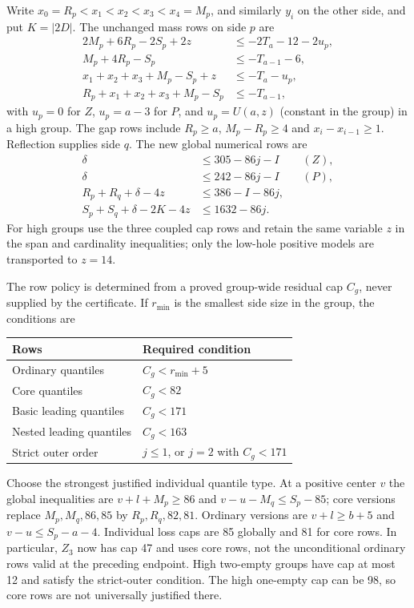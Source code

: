 \documentclass[11pt,a4paper]{article}
\begin{document}
Write $x_0=R_p<x_1<x_2<x_3<x_4=M_p$, and similarly $y_i$ on the other
side, and put $K=|2D|$. The unchanged mass rows on side $p$ are
\begin{align*}
 2M_p+6R_p-2S_p+2z&\le-2T_a-12-2u_p,\\
 M_p+4R_p-S_p&\le-T_{a-1}-6,\\
 x_1+x_2+x_3+M_p-S_p+z&\le-T_a-u_p,\\
 R_p+x_1+x_2+x_3+M_p-S_p&\le-T_{a-1},
\end{align*}
with $u_p=0$ for $Z$, $u_p=a-3$ for $P$, and $u_p=U(a,z)$ (constant in the group) in a
high group. The gap rows include $R_p\ge a$,
$M_p-R_p\ge4$ and $x_i-x_{i-1}\ge1$. Reflection supplies side $q$.
The new global numerical rows are
\begin{align*}
 \delta&\le305-86j-I &&(Z),\\
 \delta&\le242-86j-I &&(P),\\
 R_p+R_q+\delta-4z&\le386-I-86j,\\
 S_p+S_q+\delta-2K-4z&\le1632-86j.
\end{align*}
For high groups use the three coupled cap rows and retain the same variable
$z$ in the span and cardinality inequalities; only the low-hole positive models
are transported to $z=14$.

The row policy is determined from a proved group-wide residual cap
$C_g$, never supplied by the certificate. If $r_{\min}$ is the smallest
side size in the group, the conditions are
\begin{center}\small
\begin{tabular}{ll}\toprule
Rows&Required condition\\\midrule
Ordinary quantiles&$C_g<r_{\min}+5$\\
Core quantiles&$C_g<82$\\
Basic leading quantiles&$C_g<171$\\
Nested leading quantiles&$C_g<163$\\
Strict outer order&$j\le1$, or $j=2$ with $C_g<171$\\\bottomrule
\end{tabular}
\end{center}
Choose the strongest justified individual quantile type. At a positive
center $v$ the global inequalities are
$v+l+M_p\ge86$ and $v-u-M_q\le S_p-85$; core versions replace
$M_p,M_q,86,85$ by $R_p,R_q,82,81$. Ordinary versions are
$v+l\ge b+5$ and $v-u\le S_p-a-4$.
Individual loss caps are 85 globally and 81 for core rows.
In particular, $Z_3$ now has cap 47 and uses core rows, not the
unconditional ordinary rows valid at the preceding endpoint.
High two-empty groups have cap at most 12 and satisfy the strict-outer
condition. The high one-empty cap can be 98, so core rows are not
universally justified there.
\end{document}
